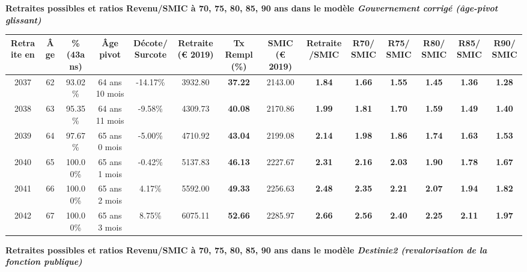  \vspace{0.1cm} 
{\bf \noindent Retraites possibles et ratios Revenu/SMIC à 70, 75, 80, 85, 90 ans dans le modèle \emph{Gouvernement corrigé (âge-pivot glissant)}}  
 
\begin{adjustbox}{max width=\textwidth} 
\begin{tabular}[htb]{|c|c||c|c|c||c|c||c|c||c|c|c|c|c|} 
\hline 
 Retraite en &  Âge &  \%(43ans) &  Âge pivot &  Décote/Surcote &  Retraite (\euro{} 2019) &  Tx Rempl(\%) &  SMIC (\euro{} 2019) &  Retraite/SMIC &  R70/SMIC &  R75/SMIC &  R80/SMIC &  R85/SMIC &  R90/SMIC \\ 
\hline \hline 
 2037 &  62 &  93.02\% &  64 ans 10 mois &  -14.17\% &  3932.80 &  {\bf 37.22} &  2143.00 &  {\bf 1.84} &  {\bf 1.66} &  {\bf 1.55} &  {\bf 1.45} &  {\bf 1.36} &  {\bf 1.28} \\ 
\hline 
 2038 &  63 &  95.35\% &  64 ans 11 mois &  -9.58\% &  4309.73 &  {\bf 40.08} &  2170.86 &  {\bf 1.99} &  {\bf 1.81} &  {\bf 1.70} &  {\bf 1.59} &  {\bf 1.49} &  {\bf 1.40} \\ 
\hline 
 2039 &  64 &  97.67\% &  65 ans 0 mois &  -5.00\% &  4710.92 &  {\bf 43.04} &  2199.08 &  {\bf 2.14} &  {\bf 1.98} &  {\bf 1.86} &  {\bf 1.74} &  {\bf 1.63} &  {\bf 1.53} \\ 
\hline 
 2040 &  65 &  100.00\% &  65 ans 1 mois &  -0.42\% &  5137.83 &  {\bf 46.13} &  2227.67 &  {\bf 2.31} &  {\bf 2.16} &  {\bf 2.03} &  {\bf 1.90} &  {\bf 1.78} &  {\bf 1.67} \\ 
\hline 
 2041 &  66 &  100.00\% &  65 ans 2 mois &  4.17\% &  5592.00 &  {\bf 49.33} &  2256.63 &  {\bf 2.48} &  {\bf 2.35} &  {\bf 2.21} &  {\bf 2.07} &  {\bf 1.94} &  {\bf 1.82} \\ 
\hline 
 2042 &  67 &  100.00\% &  65 ans 3 mois &  8.75\% &  6075.11 &  {\bf 52.66} &  2285.97 &  {\bf 2.66} &  {\bf 2.56} &  {\bf 2.40} &  {\bf 2.25} &  {\bf 2.11} &  {\bf 1.97} \\ 
\hline 
\hline 
\end{tabular} 
\end{adjustbox} 
 
 \vspace{0.1cm} 
{\bf \noindent Retraites possibles et ratios Revenu/SMIC à 70, 75, 80, 85, 90 ans dans le modèle \emph{Destinie2 (revalorisation de la fonction publique)}}  
 

